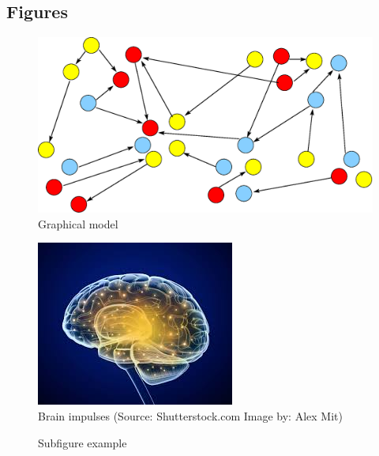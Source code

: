 \documentclass[11pt,a4paper]{article}
\begin{document}
\subsection{Figures}

\begin{figure}[ht]
	\begin{center}
		\includegraphics[width=0.7\linewidth]{gm.eps}
		\caption{Graphical model}
	\end{center}
\end{figure}

\begin{figure}[h!]
	\begin{center}
		\includegraphics[width=0.5\linewidth]{brain.jpg}
		\caption{Brain impulses (Source: Shutterstock.com Image by: Alex Mit)}
	\end{center}
\end{figure}

\begin{figure}
\centering
{} 
\caption{Subfigure example}
\end{figure}
\end{document}
